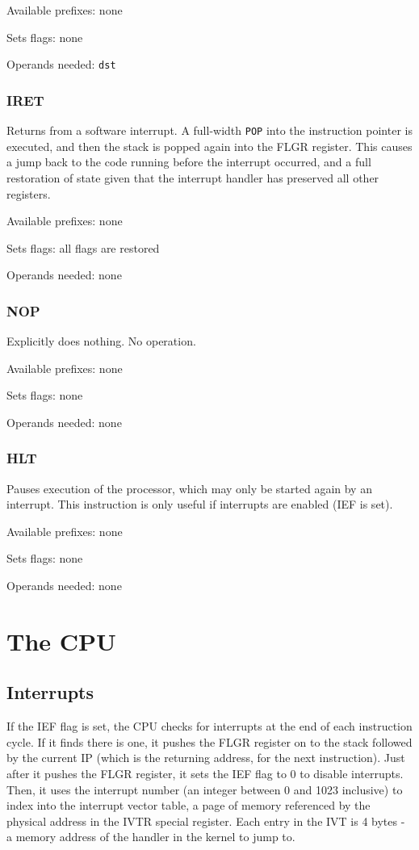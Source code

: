 \documentclass[12pt,a4paper]{report}
\begin{document}
Available prefixes: none

Sets flags: none

Operands needed: \texttt{dst}

\subsection*{IRET}
Returns from a software interrupt. A full-width \texttt{POP} into the instruction pointer is executed, and then the stack is popped again into the FLGR register. This causes a jump back to the code running before the interrupt occurred, and a full restoration of state given that the interrupt handler has preserved all other registers.

Available prefixes: none

Sets flags: all flags are restored

Operands needed: none


\subsection*{NOP}
Explicitly does nothing. No operation.

Available prefixes: none

Sets flags: none

Operands needed: none

\subsection*{HLT}
Pauses execution of the processor, which may only be started again by an interrupt. This instruction is only useful if interrupts are enabled (IEF is set).

Available prefixes: none

Sets flags: none

Operands needed: none

\chapter{The CPU}

\section{Interrupts} \label{interrupts}

If the IEF flag is set, the CPU checks for interrupts at the end of each instruction cycle. If it finds there is one, it pushes the FLGR register on to the stack followed by the current IP (which is the returning address, for the next instruction). Just after it pushes the FLGR register, it sets the IEF flag to 0 to disable interrupts. Then, it uses the interrupt number (an integer between 0 and 1023 inclusive) to index into the interrupt vector table, a page of memory referenced by the physical address in the IVTR special register. Each entry in the IVT is 4 bytes - a memory address of the handler in the kernel to jump to.
\end{document}
